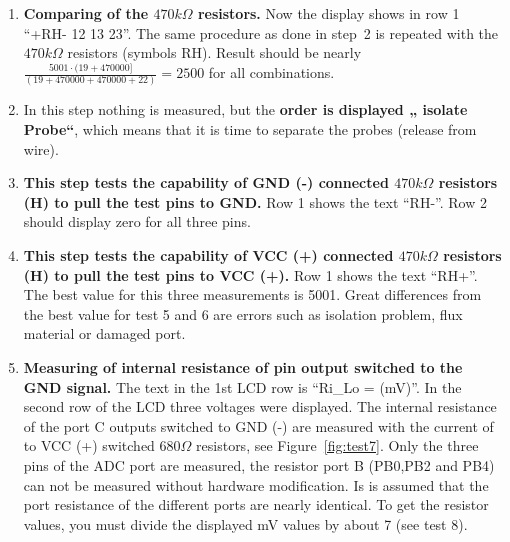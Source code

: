 \begin{enumerate}
\item {\bf Comparing of the \(470k\Omega\) resistors.}
Now the display shows in row 1 ``+RH- 12 13 23''. The same procedure as done in step~2 is repeated with the \(470k\Omega\) resistors (symbols RH).
Result should be nearly \(\frac{5001 \cdot (19 + 470000]}{ (19 + 470000 + 470000 + 22)} = 2500\) for all combinations.
\item In this step nothing is measured, but the {\bf order is displayed „ isolate Probe“},
which means that it is time to separate the probes (release from wire).
\item {\bf This step tests the capability of GND (-) connected \(470k\Omega\) resistors (H) to pull the test pins to GND.}
Row 1 shows the text  ``RH-''.
Row 2 should display zero for all three pins.
\item {\bf This step tests the capability of VCC (+) connected \(470k\Omega\) resistors (H) to pull the test pins  to VCC (+).}
Row 1 shows the text ``RH+''.
The best value for this three measurements  is 5001.
 Great differences from the best value for test 5 and 6 are errors  such as isolation problem, flux material or damaged port.
\item {\bf Measuring of internal resistance of pin output switched to the GND signal.}
The text in the 1st LCD row is ``Ri\_Lo = (mV)''.
In the second row of the LCD three voltages were displayed.
The internal resistance of the port C outputs switched to GND (-) are measured with the current
of to VCC (+) switched \(680\Omega\) resistors, see Figure~\ref{fig:test7}.
Only the three pins of the ADC port are measured, the resistor port B (PB0,PB2 and PB4) can not be measured
without hardware modification.
Is is assumed that the port resistance of the different ports are nearly identical.
To get the resistor values, you must divide the displayed mV values by about 7 (see test 8). 
\begin{figure}[H]
\centering

\end{figure}
\end{enumerate}
